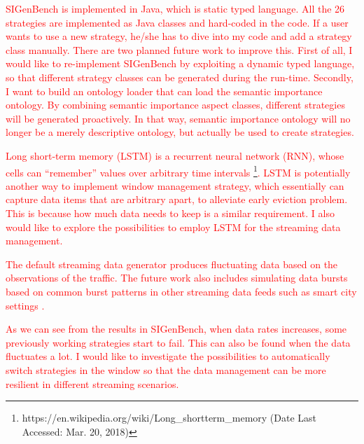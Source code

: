 \textcolor{red}{
SIGenBench is implemented in Java, which is static typed language.
All the 26 strategies are implemented as Java classes and hard-coded in the code. 
If a user wants to use a new strategy, he/she has to dive into my code and add a strategy class manually. 
There are two planned future work to improve this. 
First of all, I would like to re-implement SIGenBench by exploiting a dynamic typed language, so that different strategy classes can be generated during the run-time. 
Secondly, I want to build an ontology loader that can load the semantic importance ontology.
By combining semantic importance aspect classes, different strategies will be generated proactively. 
In that way, semantic importance ontology will no longer be a merely descriptive ontology, but actually be used to create strategies.
}

\textcolor{red}{
Long short-term memory (LSTM) \cite{DBLP:journals/neco/HochreiterS97} is a recurrent neural network (RNN), whose cells can ``remember'' values over arbitrary time intervals \footnote{https://en.wikipedia.org/wiki/Long\_short\-term\_memory (Date Last Accessed: Mar. 20, 2018)}.
LSTM is potentially another way to implement window management strategy, which essentially can capture data items that are arbitrary apart, to alleviate early eviction problem. 
This is because how much data needs to keep is a similar requirement. 
I also would like to explore the possibilities to employ LSTM for the streaming data management. 
}

\textcolor{red}{
The default streaming data generator produces fluctuating data based on the observations of the traffic. 
The future work also includes simulating data bursts based on common burst patterns in other streaming data feeds such as smart city settings \cite{tonjes2014real}.
}

\textcolor{red}{
As we can see from the results in SIGenBench, when data rates increases, some previously working strategies start to fail.
This can also be found when the data fluctuates a lot.
I would like to investigate the possibilities to automatically switch strategies in the window so that the data management can be more resilient in different streaming scenarios. 
}
%
